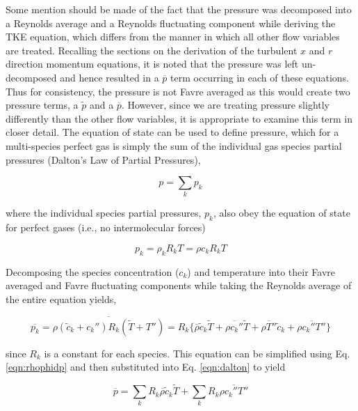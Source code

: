 	Some mention should be made of the fact that the pressure was decomposed into a Reynolds average and 
a Reynolds fluctuating component while deriving the TKE equation, which differs from the manner in which all other flow 
variables are treated.  Recalling
the sections on the derivation of the turbulent $x$ and $r$ direction momentum equations, it is noted that the pressure
was left un-decomposed and hence resulted in a $\overline{p}$ term occurring in each of these equations.  Thus for consistency,
the pressure is not Favre averaged as this would create two pressure terms, a $\tilde p$ and a $\overline{p}$.  However,
since we are treating pressure slightly differently than the other flow variables, it is appropriate to examine this term 
in closer detail.  The equation of state can be used to define pressure, which for a multi-species perfect gas is simply
the sum of the individual gas species partial pressures (Dalton's Law of Partial Pressures),

\begin{equation}
	p = \sum_k p_k
\label{eqn:dalton}
\end{equation}   
	
	where the individual species partial pressures, $p_k$, also obey the equation of state for perfect gases (i.e., no
intermolecular forces)

\begin{equation}
	p_k = \rho_k R_k T = \rho c_k R_k T
\label{eqn:pres_k}
\end{equation}
	
	Decomposing the species concentration ($c_k$) and temperature into their Favre averaged and Favre fluctuating
components while taking the Reynolds average of the entire equation yields,

\begin{displaymath}
	\overline{p_k} = \overline{\rho (\tilde c_k + c_k'') R_k (\tilde T + T'')} = R_k \Big\{ \overline{\rho}\tilde c_k 
	\tilde T + \overline{\rho c_k''}\tilde T + \overline{\rho T''}\tilde c_k + \overline{\rho c_k'' T''}\Big\}
\end{displaymath}

	since $R_k$ is a constant for each species.  This equation can be simplified using Eq. \ref{eqn:rhophidp} and then
substituted into Eq. \ref{eqn:dalton} to yield

\begin{equation}
	\overline{p} = \sum_{k} R_k \overline{\rho}\tilde c_k \tilde T + \sum_{k}R_k\overline{\rho c_k'' T''}
\label{eqn:pbar}
\end{equation}

